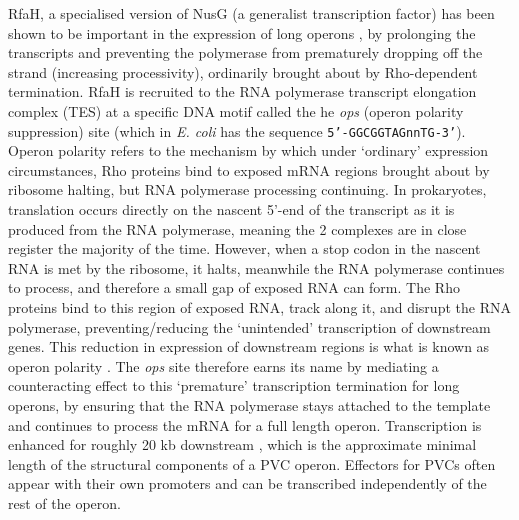 RfaH, a specialised version of NusG (a generalist transcription factor) has been shown to be important in the expression of long operons \citep{Bailey1996}, by prolonging the transcripts and preventing the polymerase from prematurely dropping off the strand (increasing processivity), ordinarily brought about by Rho-dependent termination. RfaH is recruited to the RNA polymerase transcript elongation complex (TES) at a specific DNA motif called the he \emph{ops} (operon polarity suppression) site (which in \emph{E. coli} has the sequence \texttt{5'-GGCGGTAGnnTG-3'}). Operon polarity refers to the mechanism by which under `ordinary' expression circumstances, Rho proteins bind to exposed mRNA regions brought about by ribosome halting, but RNA polymerase processing continuing. In prokaryotes, translation occurs directly on the nascent 5'-end of the transcript as it is produced from the RNA polymerase, meaning the 2 complexes are in close register the majority of the time. However, when a stop codon in the nascent RNA is met by the ribosome, it halts, meanwhile the RNA polymerase continues to process, and therefore a small gap of exposed RNA can form. The Rho proteins bind to this region of exposed RNA, track along it, and disrupt the RNA polymerase, preventing/reducing the `unintended' transcription of downstream genes. This reduction in expression of downstream regions is what is known as operon polarity \citep{Santangelo2008, Adhya1974, Banerjee2006, Nudler2002}. The \emph{ops} site therefore earns its name by mediating a counteracting effect to this `premature' transcription termination for long operons, by ensuring that the RNA polymerase stays attached to the template and continues to process the mRNA for a full length operon. Transcription is enhanced for roughly 20 kb downstream \citep{Artsimovitch2002, Leeds1996, Leeds1997}, which is the approximate minimal length of the structural components of a PVC operon. Effectors for PVCs often appear with their own promoters and can be transcribed independently of the rest of the operon.


